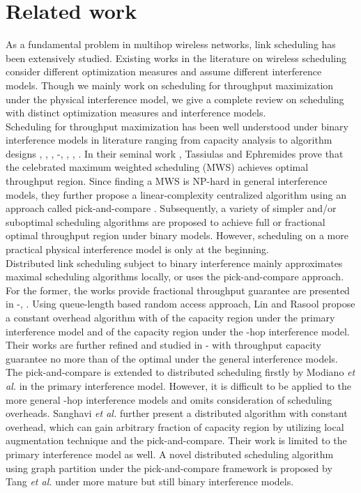 \documentclass[journal]{IEEEtran}
\begin{document}
\section{Related work}
As a fundamental problem in multihop wireless networks, link scheduling has been extensively studied. Existing works in the literature on wireless scheduling consider different optimization measures and assume different interference models. Though we mainly work on scheduling for throughput maximization under the physical interference model, we give a complete review on scheduling with distinct optimization measures and interference models.\\
\indent Scheduling for throughput maximization has been well understood under binary interference models in literature ranging from capacity analysis  to  algorithm designs
\cite{S:pick1}, \cite{S:pick2}, \cite{S:pick3}, \cite{S:constant1}-\cite{S:constant4}, \cite{S:GMS}, \cite{S:MWM2}, \cite{S:MS}. In their seminal work \cite{S:MWM1}, Tassiulas and Ephremides prove that the celebrated maximum weighted scheduling (MWS) achieves optimal throughput region. Since finding a MWS is NP-hard in general interference models, they further propose a linear-complexity centralized algorithm using an approach called pick-and-compare \cite{S:MWM2}. Subsequently, a variety of simpler and/or suboptimal scheduling algorithms are proposed to achieve full or fractional optimal throughput region under binary models. However, scheduling on a more practical physical interference model is only at the beginning.\\
\indent Distributed link scheduling subject to binary interference mainly approximates maximal scheduling algorithms locally, or uses the pick-and-compare approach.\\
\indent For the former, the works provide fractional throughput guarantee are presented in \cite{S:constant1}-\cite{S:constant4}, \cite{S:MS}. Using queue-length based random access approach, Lin and Rasool \cite{S:constant1} propose a constant overhead algorithm with   of the capacity region under the primary interference model and    of the capacity region under the -hop interference model. Their works are further refined and studied in \cite{S:constant2}-\cite{S:constant4} with throughput capacity guarantee no more than   of the optimal under the general interference models.\\
\indent The pick-and-compare is extended to distributed scheduling firstly by Modiano \emph{et al.} \cite{S:pick3} in the primary interference model. However, it is difficult to be applied to the more general -hop interference models and omits consideration of scheduling overheads. Sanghavi \emph{et al.} \cite{S:pick1} further present a distributed algorithm with constant overhead, which can gain arbitrary fraction of capacity region by utilizing local augmentation technique and the pick-and-compare. Their work is limited to the primary interference model as well. A novel distributed scheduling  algorithm using graph partition under the pick-and-compare framework is proposed by Tang \emph{et al.} \cite{S:pick2} under more mature but still binary interference models.\\
\end{document}
